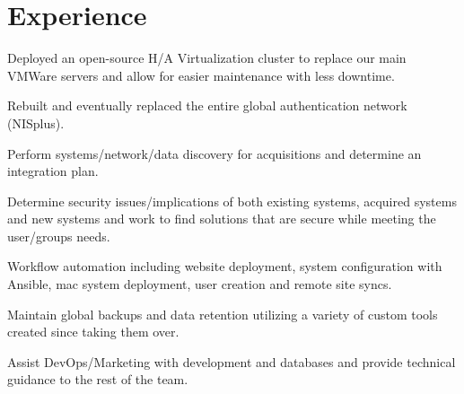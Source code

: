 \documentclass[letterpaper]{deedy-resume} %
\begin{document}
\begin{minipage}[t]{0.66\textwidth} %


\section{Experience}


\vspace{\topsep} %
\begin{tightitemize}
\item Deployed an open-source H/A Virtualization cluster to replace our main VMWare servers and allow for easier maintenance with less downtime.
\item Rebuilt and eventually replaced the entire global authentication network (NISplus).
\item Perform systems/network/data discovery for acquisitions and determine an integration plan.
\item Determine security issues/implications of both existing systems, acquired systems and new systems and work to find solutions that are secure while meeting the user/groups needs.
\item Workflow automation including website deployment, system configuration with Ansible, mac system deployment, user creation and remote site syncs.
\item Maintain global backups and data retention utilizing a variety of custom tools created since taking them over.
\item Assist DevOps/Marketing with development and databases and provide technical guidance to the rest of the team.
\end{tightitemize}





\end{minipage}
\end{document}
